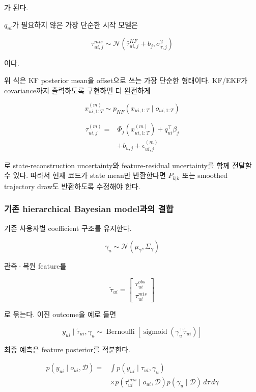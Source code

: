\documentclass[letterpaper,10pt,journal,twocolumn]{ieeeconf}
\newcommand{\Normal}{\mathcal{N}}
\newcommand{\Data}{\mathcal{D}}
\newcommand{\Bernoulli}{\operatorname{Bernoulli}}
\newcommand{\sigmoid}{\operatorname{sigmoid}}
\begin{document}
가 된다.

\(q_{ui}\)가 필요하지 않은 가장 단순한 시작 모델은

\[
\tau_{ui,j}^{mis}
\sim
\Normal
\left(
\hat\tau_{ui,j}^{KF}+b_j,
\sigma_{\tau,j}^{2}
\right)
\]

이다.

위 식은 KF posterior mean을 offset으로 쓰는 가장 단순한 형태이다. KF/EKF가 covariance까지 출력하도록 구현하면 더 완전하게

\[
x_{ui,1:T}^{(m)}
\sim
p_{KF}
\left(
x_{ui,1:T}\mid o_{ui,1:T}
\right)
\]

\[
\begin{aligned}
\tau_{ui,j}^{(m)}
={}&\Phi_j\!\left(x_{ui,1:T}^{(m)}\right)
+q_{ui}^{\top}\beta_j\\
&+b_{u,j}
+\epsilon_{ui,j}^{(m)}
\end{aligned}
\]

로 state-reconstruction uncertainty와 feature-residual uncertainty를 함께 전달할 수 있다. 따라서 현재 코드가 state mean만 반환한다면 \(P_{k|k}\) 또는 smoothed trajectory draw도 반환하도록 수정해야 한다.

\subsubsection{기존 hierarchical Bayesian model과의 결합}

기존 사용자별 coefficient 구조를 유지한다.

\[
\gamma_u
\sim
\Normal(\mu_\gamma,\Sigma_\gamma)
\]

관측·복원 feature를

\[
\widetilde\tau_{ui}
=
\begin{bmatrix}
\tau_{ui}^{obs}\\
\tau_{ui}^{mis}
\end{bmatrix}
\]

로 묶는다. 이진 outcome을 예로 들면

\[
y_{ui}\mid\widetilde\tau_{ui},\gamma_u
\sim
\Bernoulli\!\left[
\sigmoid\!\left(\gamma_u^\top\widetilde\tau_{ui}\right)
\right]
\]

최종 예측은 feature posterior를 적분한다.

\[
\begin{aligned}
p(y_{ui}\mid o_{ui},\Data)
={}&
\int p(y_{ui}\mid\tau_{ui},\gamma_u)\\
&\times p(\tau_{ui}^{mis}\mid o_{ui},\Data)
p(\gamma_u\mid\Data)
\,d\tau\,d\gamma
\end{aligned}
\]
\end{document}

